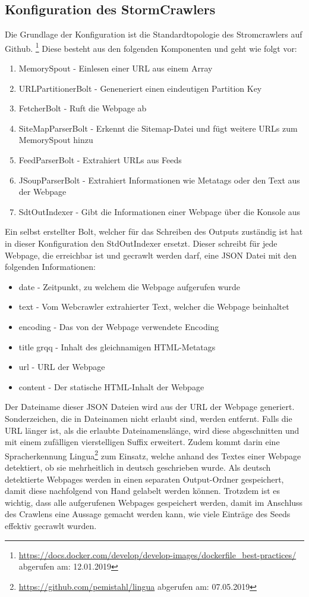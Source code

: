 \subsection{Konfiguration des StormCrawlers}
Die Grundlage der Konfiguration ist die Standardtopologie des Stromcrawlers auf Github.
\footnote{\url{https://docs.docker.com/develop/develop-images/dockerfile_best-practices/} abgerufen am: 12.01.2019}
Diese besteht aus den folgenden Komponenten und geht wie folgt vor:
\begin{enumerate}
	\item MemorySpout - Einlesen einer URL aus einem Array
	\item URLPartitionerBolt - Geneneriert einen eindeutigen Partition Key
	\item FetcherBolt - Ruft die Webpage ab
	\item SiteMapParserBolt - Erkennt die Sitemap-Datei und fügt weitere URLs zum MemorySpout hinzu
	\item FeedParserBolt - Extrahiert URLs aus Feeds
	\item JSoupParserBolt - Extrahiert Informationen wie Metatags oder den Text aus der Webpage
	\item SdtOutIndexer - Gibt die Informationen einer Webpage über die Konsole aus
\end{enumerate}
Ein selbst erstellter Bolt, welcher für das Schreiben des Outputs zuständig ist hat in dieser Konfiguration den StdOutIndexer ersetzt.
Dieser schreibt für jede Webpage, die erreichbar ist und gecrawlt werden darf, eine JSON Datei mit den folgenden Informationen:
\begin{itemize}
	\item \glqq date\grqq{} - Zeitpunkt, zu welchem die Webpage aufgerufen wurde
	\item \glqq text\grqq{} - Vom Webcrawler extrahierter Text, welcher die Webpage beinhaltet
	\item \glqq encoding\grqq{} - Das von der Webpage verwendete Encoding
	\item \glqq title grqq{} - Inhalt des gleichnamigen HTML-Metatags
	\item \glqq url\grqq{} - URL der Webpage
	\item \glqq content\grqq{} - Der statische HTML-Inhalt der Webpage	
\end{itemize}
Der Dateiname dieser JSON Dateien wird aus der URL der Webpage generiert. 
Sonderzeichen, die in Dateinamen nicht erlaubt sind, werden entfernt. Falls die URL länger ist, als die erlaubte Dateinamenslänge, wird diese abgeschnitten und mit einem zufälligen vierstelligen Suffix erweitert.
Zudem kommt darin eine Spracherkennung \glqq Lingua\footnote{\url{https://github.com/pemistahl/lingua} abgerufen am: 07.05.2019}\grqq{} zum Einsatz, welche anhand des Textes einer Webpage detektiert, ob sie mehrheitlich in deutsch geschrieben wurde.
Als deutsch detektierte Webpages werden in einen separaten Output-Ordner gespeichert, damit diese nachfolgend von Hand gelabelt werden können.
Trotzdem ist es wichtig, dass alle aufgerufenen Webpages gespeichert werden, damit im Anschluss des Crawlens eine Aussage gemacht werden kann, wie viele Einträge des Seeds effektiv gecrawlt wurden.
